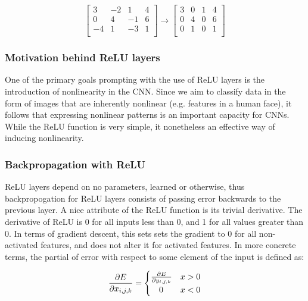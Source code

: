 \documentclass[a4paper, 11pt]{article} %
\begin{document}
\begin{equation}
\left[ {\begin{array}{cccc}
3 & -2 & 1 & 4\\
0 & 4 & -1 & 6\\
-4 & 1 & -3 & 1\\
\end{array} } \right]
\rightarrow
\left[ {\begin{array}{cccc}
3 & 0 & 1 & 4\\
0 & 4 & 0 & 6\\
0 & 1 & 0 & 1\\
\end{array} } \right]
\end{equation}

\subsubsection*{Motivation behind ReLU layers}

One of the primary goals prompting with the use of ReLU layers is the introduction of nonlinearity in the CNN.  Since we aim to classify data in the form of images that are inherently nonlinear (e.g. features in a human face), it follows that expressing nonlinear patterns is an important capacity for CNNs\cite{wu}.  While the ReLU function is very simple, it nonetheless an effective way of inducing nonlinearity.

\subsubsection*{Backpropagation with ReLU}

ReLU layers depend on no parameters, learned or otherwise, thus backpropogation for ReLU layers consists of passing error backwards to the previous layer.  A nice attribute of the ReLU function is its trivial derivative.  The derivative of ReLU is 0 for all inputs less than 0, and 1 for all values greater than 0.  In terms of gradient descent, this sets sets the gradient to 0 for all non-activated features, and does not alter it for activated features\cite{wu}.  In more concrete terms, the partial of error with respect to some element of the input is defined as:

\begin{equation}
\frac{\partial E}{\partial x_{i,j,k}} = 
\begin{cases}
\frac{\partial E}{\partial y_{i,j,k}} & x > 0\\
\hspace{.35cm}0 & x < 0
\end{cases}
\end{equation}
\end{document}
